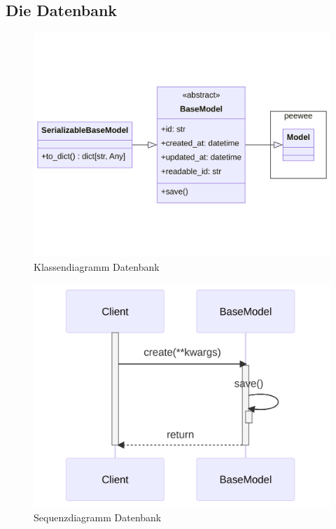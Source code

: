 \subsection{Die Datenbank}

\begin{figure}[!hb]
	\centering
	\includegraphics[width=0.75\linewidth]{images/diagrams/database-class.png}
	\caption{Klassendiagramm Datenbank}
	\label{fig:database-class}
\end{figure}

\begin{figure}[!hb]
	\centering
	\includegraphics[width=0.75\linewidth]{images/diagrams/database-seq.png}
	\caption{Sequenzdiagramm Datenbank}
	\label{fig:database-seq}
\end{figure}